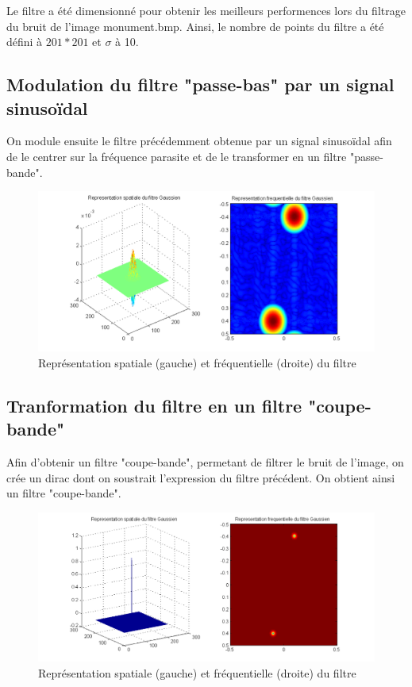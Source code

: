 \documentclass[11pt]{article}
\begin{document}
	Le filtre a été dimensionné pour obtenir les meilleurs performences lors du filtrage du bruit de l'image monument.bmp. Ainsi, le nombre de points du filtre a été défini à $201*201$ et $\sigma$ à 10.
	
	\subsection{Modulation du filtre "passe-bas" par un signal sinusoïdal}
	
	On module ensuite le filtre précédemment obtenue par un signal sinusoïdal afin de le centrer sur la fréquence parasite et de le transformer en un filtre "passe-bande".
	
		\begin{figure}[H]
			\centering
			\includegraphics[scale=0.65]{img/img4.png}
			\caption{Représentation spatiale (gauche) et fréquentielle (droite) du filtre}
			\label{img4}
		\end{figure}

\subsection{Tranformation du filtre en un filtre "coupe-bande"}

	Afin d'obtenir un filtre "coupe-bande", permetant de filtrer le bruit de l'image, on crée un dirac dont on soustrait l'expression du filtre précédent. On obtient ainsi un filtre "coupe-bande".

		\begin{figure}[h]
			\centering
			\includegraphics[scale=0.65]{img/img5.png}
			\caption{Représentation spatiale (gauche) et fréquentielle (droite) du filtre}
			\label{img5}
		\end{figure}	
\end{document}
